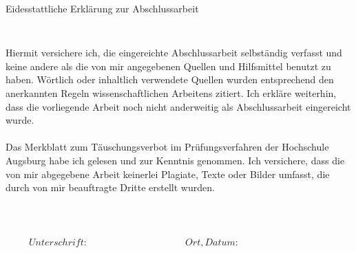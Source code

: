 \newpage

\thispagestyle{empty}

\begin{verbatim}

\end{verbatim}

\begin{LARGE}
\begin{center}
	Eidesstattliche Erklärung zur Abschlussarbeit
\end{center}
\end{LARGE}
\begin{verbatim}


\end{verbatim}
Hiermit versichere ich, die eingereichte Abschlussarbeit selbständig verfasst und
keine andere als die von mir angegebenen Quellen und Hilfsmittel benutzt zu haben.
Wörtlich oder inhaltlich verwendete Quellen wurden entsprechend den anerkannten
Regeln wissenschaftlichen Arbeitens zitiert. Ich erkläre weiterhin, dass die
vorliegende Arbeit noch nicht anderweitig als Abschlussarbeit eingereicht wurde.
\\
\\
Das Merkblatt zum Täuschungsverbot im Prüfungsverfahren der Hochschule
Augsburg habe ich gelesen und zur Kenntnis genommen. Ich versichere, dass die
von mir abgegebene Arbeit keinerlei Plagiate, Texte oder Bilder umfasst, die durch
von mir beauftragte Dritte erstellt wurden.
\begin{verbatim}



\end{verbatim}


\begin{displaymath}
\begin{array}{ll}
Unterschrift:~~~~~~~~~~~~~~~~~~~~~~~~~~~~~~~~~~~~~~~~~~
& Ort, Datum:~~~~~~~~~~~~~~~~~~~~~~~~~~~~~~~~~~~~~~~~~~
\end{array}
\end{displaymath}
